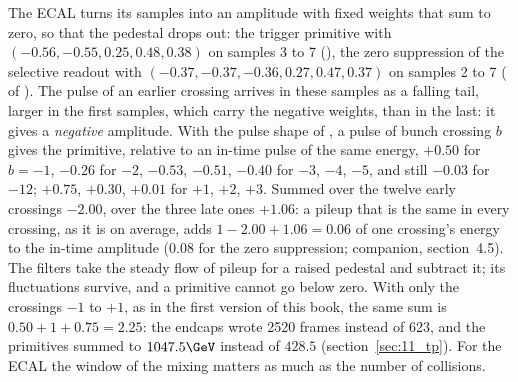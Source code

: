 \begin{plainwords}
The ECAL turns its samples into an amplitude with fixed weights that sum to zero, so that the pedestal drops out: the
trigger primitive with $(-0.56, -0.55, 0.25, 0.48, 0.38)$ on samples 3 to 7 (),
the zero suppression of the selective readout with $(-0.37, -0.37, -0.36,
0.27, 0.47, 0.37)$ on samples 2 to 7 ( of ). The pulse of an earlier
crossing arrives in these samples as a falling tail, larger in the first samples, which carry the negative weights,
than in the last: it gives a \emph{negative} amplitude. With the pulse shape of , a pulse
of bunch crossing $b$ gives the primitive, relative to an in-time pulse of the same energy, $+0.50$ for $b=-1$,
$-0.26$ for $-2$, $-0.53$, $-0.51$, $-0.40$ for $-3$, $-4$, $-5$, and still $-0.03$ for $-12$; $+0.75$, $+0.30$,
$+0.01$ for $+1$, $+2$, $+3$. Summed over the twelve early crossings $-2.00$, over the three late ones $+1.06$: a
pileup that is the same in every crossing, as it is on average, adds $1-2.00+1.06=0.06$ of one crossing's energy to
the in-time amplitude (0.08 for the zero suppression; companion, section~4.5). The filters take the steady flow of
pileup for a raised pedestal and subtract it; its fluctuations survive, and a primitive cannot go below zero. With only the crossings $-1$ to $+1$, as in the first version of this
book, the same sum is $0.50+1+0.75=2.25$: the endcaps wrote 2520 frames instead of 623, and the primitives summed to
$1047.5\GeV$ instead of $428.5$ (section~\ref{sec:11_tp}). For the ECAL the window of the mixing matters as much as
the number of collisions.
\end{plainwords}

